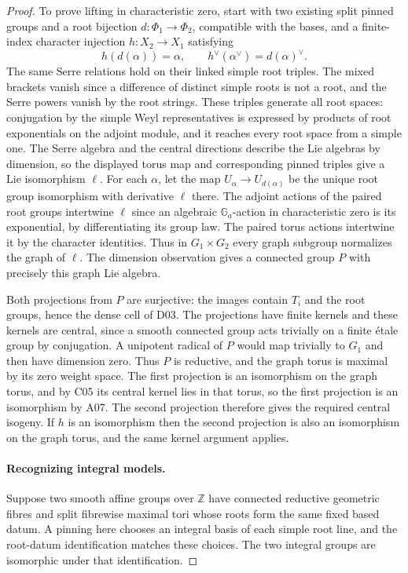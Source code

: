 \documentclass[11pt,a4paper,openany,oneside]{book}
\theoremstyle{resultstyle}
\theoremstyle{definition}
\numberwithin{equation}{chapter}
\newcommand{\Ga}{\mathbb{G}_a}
\newcommand{\ZZ}{\mathbb{Z}}
\begin{document}
\begin{proof}
To prove lifting in characteristic zero, start with
two existing split pinned groups and a root bijection
\(d:\Phi_1\to\Phi_2\), compatible with the bases, and
a finite-index character injection \(h:X_2\to X_1\)
satisfying
\[
 h(d(\alpha))=\alpha,\qquad
 h^\vee(\alpha^\vee)=d(\alpha)^\vee .
\]
The same Serre relations hold on their linked simple
root triples. The mixed brackets vanish since a difference
of distinct simple roots is not a root, and the
Serre powers vanish by the root strings. These triples
generate all root spaces: conjugation by the simple
Weyl representatives is expressed by products of root
exponentials on the adjoint module, and it reaches every
root space from a simple one. The Serre algebra and the
central directions describe the Lie algebras by dimension,
so the displayed torus map and corresponding pinned triples
give a Lie isomorphism \(\ell\). For each \(\alpha\), let
the map \(U_\alpha\to U_{d(\alpha)}\) be the unique root
group isomorphism with derivative \(\ell\) there. The
adjoint actions of the paired root groups intertwine
\(\ell\) since an algebraic \(\Ga\)-action in characteristic
zero is its exponential, by differentiating its group law.
The paired torus actions intertwine it by the character
identities. Thus in \(G_1\times G_2\) every graph subgroup
normalizes the graph of \(\ell\). The dimension observation
gives a connected group \(P\) with precisely this graph
Lie algebra.

Both projections from \(P\) are surjective: the images
contain \(T_i\) and the root groups, hence the dense
cell of D03. The projections have finite kernels and these
kernels are central, since a smooth connected group acts
trivially on a finite \'{e}tale group by conjugation. A
unipotent radical of \(P\) would map trivially to \(G_1\)
and then have dimension zero. Thus \(P\) is reductive,
and the graph torus is maximal by its zero weight space.
The first projection is an isomorphism on the graph
torus, and by C05 its central kernel lies in that torus,
so the first projection is an isomorphism by A07.
The second projection therefore gives the required
central isogeny. If \(h\) is an isomorphism then the
second projection is also an isomorphism on the graph
torus, and the same kernel argument applies.

\paragraph{Recognizing integral models.}
Suppose two smooth affine groups over \(\ZZ\) have connected
reductive geometric fibres and split fibrewise maximal tori
whose roots form the same fixed based datum. A pinning here
chooses an integral basis of each simple root line, and the
root-datum identification matches these choices. The two
integral groups are isomorphic under that identification.


\end{proof}
\end{document}
